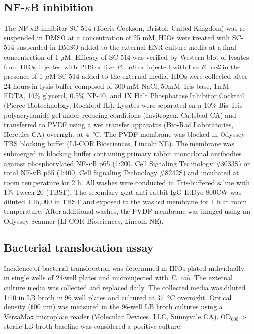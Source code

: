 \documentclass[9pt,lineo]{elife}
\begin{document}
\subsection*{{\bfseries\sffamily } NF-\(\kappa\)B inhibition}
\label{sec:orgheadline20}
The NF-\(\kappa\)B inhibitor SC-514 \citep{Kishore:2003,Litvak:2009} (Tocris Cookson, Bristol, United Kingdom) was re-suspended in DMSO at a concentration of 25 mM. HIOs were treated with SC-514 suspended in DMSO added to the external ENR culture media at a final concentration of 1 \(\mu\)M. Efficacy of SC-514 was verified by Western blot of lysates from HIOs injected with PBS or live \emph{E. coli} or injected with live \emph{E. coli} in the presence of 1 \(\mu\)M SC-514 added to the external media. HIOs were collected after 24 hours in lysis buffer composed of 300 mM NaCl, 50mM Tris base, 1mM EDTA, 10\% glycerol, 0.5\% NP-40, and 1X Halt Phosphatase Inhibitor Cocktail (Pierce Biotechnology, Rockford IL). Lysates were separated on a 10\% Bis-Tris polyacrylamide gel under reducing conditions (Invitrogen, Carlsbad CA) and transferred to PVDF using a wet transfer apparatus (Bio-Rad Laboratories, Hercules CA) overnight at \SI{4}{\celsius}. The PVDF membrane was blocked in Odyssey TBS blocking buffer (LI-COR Biosciences, Lincoln NE). The membrane was submerged in blocking buffer containing primary rabbit monoclonal antibodies against phosphorylated NF-\(\kappa\)B p65 (1:200, Cell Signaling Technology \#3033S) or total NF-\(\kappa\)B p65 (1:400, Cell Signaling Technology \#8242S) and incubated at room temperature for 2 h. All washes were conducted in Tris-buffered saline with 1\% Tween-20 (TBST). The secondary goat anti-rabbit IgG IRDye 800CW was diluted 1:15,000 in TBST and exposed to the washed membrane for 1 h at room temperature. After additional washes, the PVDF membrane was imaged using an Odyssey Scanner (LI-COR Biosciences, Lincoln NE).
\subsection*{{\bfseries\sffamily } Bacterial translocation assay}
\label{sec:orgheadline21}
Incidence of bacterial translocation was determined in HIOs plated individually in single wells of 24-well plates and microinjected with \emph{E. coli}. The external culture media was collected and replaced daily. The collected media was diluted 1:10 in LB broth in 96 well plates and cultured at \SI{37}{\celsius} overnight. Optical density (600 nm) was measured in the 96-well LB broth cultures using a VersaMax microplate reader (Molecular Devices, LLC, Sunnyvale CA). OD\(_{\text{600}}\) > sterile LB broth baseline was considered a positive culture. 
\end{document}
